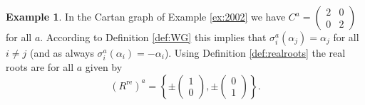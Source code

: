 \documentclass[11pt,a4paper]{amsart}
\theoremstyle{definition}
\newtheorem{Example}[Lemma]{Example}
\numberwithin{equation}{section}
\begin{document}
\begin{Example} \label{ex:2002cont}
In the Cartan graph of Example 
\ref{ex:2002} we have $C^a=\begin{pmatrix}
    2& 0 \\ 0 & 2 \end{pmatrix}$ for
    all $a$. 
    According to Definition \ref{def:WG}
    this implies that 
    $\sigma_i^a(\alpha_j)=\alpha_j$
    for all $i\neq j$ (and as always
    $\sigma_i^a(\alpha_i)=-\alpha_i$). 
    Using Definition \ref{def:realroots}
    the real roots are for all $a$
    given by
    $$(R^{\mathrm{re}})^a = \left\{ \pm
    \begin{pmatrix} 1\\0 \end{pmatrix},
    \pm
    \begin{pmatrix} 0\\1 \end{pmatrix}
    \right\}.
    $$ 
\end{Example}
\end{document}
